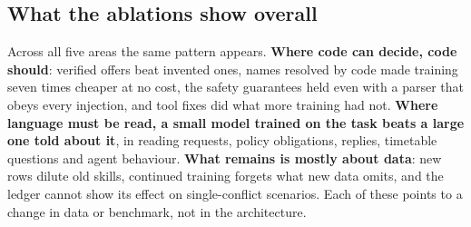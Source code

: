 \documentclass[11pt,a4paper]{article}
\begin{document}
\subsection{What the ablations show overall}
Across all five areas the same pattern appears. \textbf{Where code can decide, code should}: verified offers beat
invented ones, names resolved by code made training seven times cheaper at no cost, the safety guarantees held even
with a parser that obeys every injection, and tool fixes did what more training had not. \textbf{Where language must
be read, a small model trained on the task beats a large one told about it}, in reading requests, policy obligations,
replies, timetable questions and agent behaviour. \textbf{What remains is mostly about data}: new rows dilute old
skills, continued training forgets what new data omits, and the ledger cannot show its effect on single-conflict
scenarios. Each of these points to a change in data or benchmark, not in the architecture.

\end{document}
